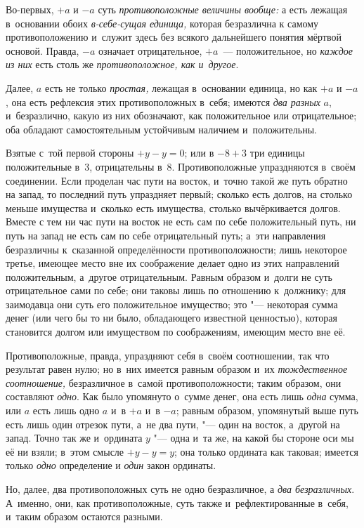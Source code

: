 Во-первых, $+a$ и $-a$ суть {\em противоположные величины вообще:}
$а$ есть лежащая в~основании обоих
{\em в-себе-сущая единица,} которая безразлична к
самому противоположению и~служит здесь без всякого дальнейшего понятия
мёртвой основой. Правда, $-a$ означает
отрицательное, $+a$~--- положительное, но
{\em каждое из них} есть столь же {\em противоположное, как и~другое}.

Далее, $a$ есть не только {\em простая,} лежащая в~основании единица, но как
$+a$ и $-a$, она есть рефлексия этих противоположных в~себя; имеются {\em два
разных} $a$, и~безразлично, какую из них обозначают, как положительное или
отрицательное; оба обладают самостоятельным устойчивым наличием и~положительны.

Взятые с~той первой стороны $+y-y=0$; или в $-8+3$ три единицы положительные
в~3, отрицательны в~8. Противоположные упраздняются в~своём соединении. Если
проделан час пути на восток, и~точно такой же путь обратно на запад, то
последний путь упраздняет первый; сколько есть долгов, на столько меньше
имущества и~сколько есть имущества, столько вычёркивается долгов. Вместе с
тем ни час пути на восток не есть сам по себе положительный путь, ни путь
на запад не есть сам по себе отрицательный путь; а~эти направления
безразличны к~сказанной определённости противоположности; лишь некоторое
третье, имеющее место вне их соображение делает одно из этих направлений
положительным, а~другое отрицательным. Равным образом и~долги не суть
отрицательное сами по себе; они таковы лишь по отношению к~должнику; для
заимодавца они суть его положительное имущество; это "--- некоторая сумма
денег (или чего бы то ни было, обладающего известной ценностью), которая
становится долгом или имуществом по соображениям, имеющим место вне её.

Противоположные, правда, упраздняют себя в~своём соотношении, так что
результат равен нулю; но в~них имеется равным образом и~их
{\em тождественное соотношение,} безразличное в~самой
противоположности; таким образом, они составляют
{\em одно}. Как было упомянуто о~сумме денег, она есть
лишь {\em одна} сумма, или $a$ есть лишь одно $a$ и~в $+a$ и~в $-a$; равным
образом, упомянутый выше путь есть лишь один отрезок пути, а~не два
пути, "--- один на восток, а~другой на запад. Точно так же и~ордината
$y$ "--- одна и~та же, на какой бы стороне оси мы её ни
взяли; в~этом смысле $+y-y=y$; она только ордината как таковая;
имеется только {\em одно} определение и {\em один} закон ординаты.

Но, далее, два противоположных суть не одно безразличное, а
{\em два безразличных}. А~именно, они, как противоположные, суть также
и~рефлектированные в~себя, и~таким образом остаются разными.

